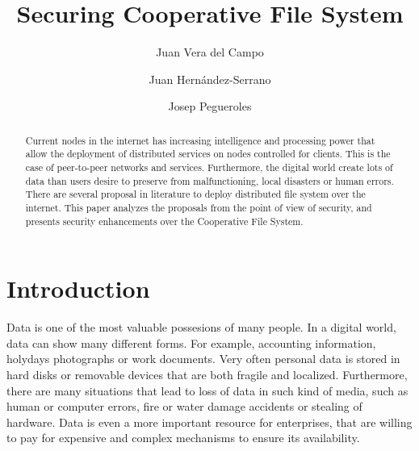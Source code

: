 \documentclass{llncs}
\begin{document}
% 
% 
%
\mainmatter              %
%
\title{Securing Cooperative File System}
%
%
\author{Juan Vera del Campo \and Juan Hernández-Serrano \and Josep Pegueroles}
%
%

\maketitle

\begin{abstract}
Current nodes in the internet has increasing intelligence and processing power that allow the deployment of distributed services on nodes controlled for clients. This is the case of peer-to-peer networks and services. Furthermore, the digital world create lots of data than users desire to preserve from malfunctioning, local disasters or human errors. There are several proposal in literature to deploy distributed file system over the internet. This paper analyzes the proposals from the point of view of security, and presents security enhancements over the Cooperative File System.
\end{abstract}

\section{Introduction}

Data is one of the most valuable possesions of many people. In a digital world, data can show many different forms. For example, accounting information, holydays photographs or work documents. Very often personal data is stored in hard disks or removable devices that are both fragile and localized. Furthermore, there are many situations that lead to loss of data in such kind of
media, such as human or computer errors, fire or water damage accidents or stealing of hardware. Data is even a more important resource for enterprises, that are willing to pay for expensive and complex mechanisms to ensure its availability.
\end{document}
